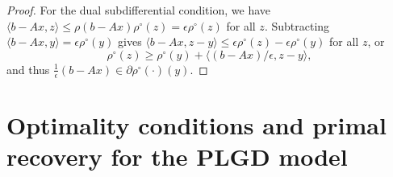 \begin{enumerate}
\begin{proof}
For the dual subdifferential condition, we have $\langle b - Ax, z \rangle \leq \rho(b-Ax) \rho^\circ(z) = \epsilon \rho^\circ(z)$ for all $z$.  Subtracting $\langle b - Ax, y \rangle = \epsilon \rho^\circ(y)$ gives $\langle b-Ax, z-y \rangle \leq \epsilon \rho^\circ(z) - \epsilon \rho^\circ(y)$ for all $z$, or
\[
\rho^\circ(z) \geq \rho^\circ(y) + \langle(b-Ax)/\epsilon, z-y\rangle,
\]
and thus $\frac{1}{\epsilon}(b - Ax) \in \partial \rho^\circ(\cdot) (y)$.


\end{proof}


\end{enumerate}







\section{Optimality conditions and primal recovery for the PLGD model}   \label{Subsec:PLGD-opt_conds_primal_recovery}


